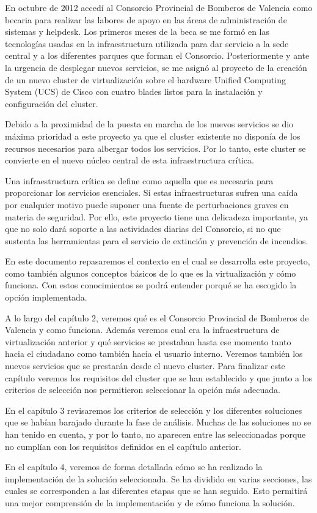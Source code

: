 \documentclass[12pt,a4paper,titlepage,twoside]{report}
\begin{document}
En octubre de 2012 accedí al Consorcio Provincial de Bomberos de Valencia como becaria para realizar las labores de apoyo en las áreas de administración de sistemas y helpdesk. Los primeros meses de la beca se me formó en las tecnologías usadas en la infraestructura utilizada para dar servicio a la sede central y a los diferentes parques que forman el Consorcio. Posteriormente y ante la urgencia de desplegar nuevos servicios, se me asignó al proyecto de la creación de un nuevo cluster de virtualización sobre el hardware Unified Computing System (UCS) de Cisco con cuatro blades listos para la instalación y configuración del cluster.
\par Debido a la proximidad de la puesta en marcha de los nuevos servicios se dio máxima prioridad a este proyecto ya que el cluster existente no disponía de los recursos necesarios para albergar todos los servicios. Por lo tanto, este cluster se convierte en el nuevo núcleo central de esta infraestructura crítica. 
\par
Una infraestructura crítica se define como aquella que es necesaria para proporcionar los servicios esenciales. Si estas infraestructuras sufren una caída por cualquier motivo puede suponer una fuente de perturbaciones graves en materia de seguridad. Por ello, este proyecto tiene una delicadeza importante, ya que no solo dará soporte a las actividades diarias del Consorcio, si no que sustenta las herramientas para el servicio de extinción y prevención de incendios.
\par
En este documento repasaremos el contexto en el cual se desarrolla este proyecto, como también algunos conceptos básicos de lo que es la virtualización y cómo funciona. Con estos conocimientos se podrá entender porqué se ha escogido la opción implementada.
\par
A lo largo del capítulo 2, veremos qué es el Consorcio Provincial de Bomberos de Valencia y como funciona. Además veremos cual era la infraestructura de virtualización anterior y qué servicios se prestaban hasta ese momento tanto hacia el ciudadano como también hacia el usuario interno. Veremos también los nuevos servicios que se prestarán desde el nuevo cluster. Para finalizar este capítulo veremos los requisitos del cluster que se han establecido y que junto a los criterios de selección nos permitieron seleccionar la opción más adecuada.
\par 
En el capítulo 3 revisaremos los criterios de selección y los diferentes soluciones que se habían barajado durante la fase de análisis. Muchas de las soluciones no se han tenido en cuenta, y por lo tanto, no aparecen entre las seleccionadas porque no cumplían con los requisitos definidos en el capítulo anterior.
\par
En el capítulo 4, veremos de forma detallada cómo se ha realizado la implementación de la solución seleccionada. Se ha dividido en varias secciones, las cuales se corresponden a las diferentes etapas que se han seguido. Esto permitirá una mejor comprensión de la implementación y de cómo funciona la solución.
\end{document}
